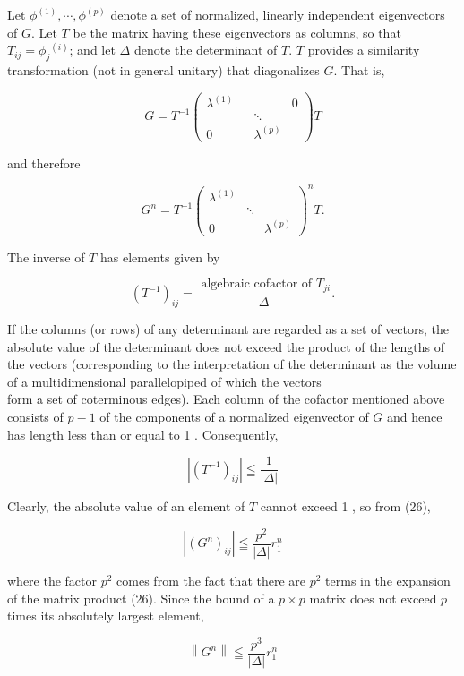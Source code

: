 \documentclass[10pt]{article}
\begin{document}
Let \(\phi^{(1)}, \cdots, \phi^{(p)}\) denote a set of normalized, linearly independent eigenvectors of \(G\). Let \(T\) be the matrix having these eigenvectors as columns, so that \(T_{i j}=\phi_{j}{ }^{(i)}\); and let \(\Delta\) denote the determinant of \(T\). \(T\) provides a similarity transformation (not in general unitary) that diagonalizes \(G\). That is,

\[
G=T^{-1}\left(\begin{array}{llll}
\lambda^{(1)} & & & 0 \\
& & \ddots & \\
0 & & \lambda^{(p)}
\end{array}\right) T
\]

and therefore

\[
G^{n}=T^{-1}\left(\begin{array}{lll}
\lambda^{(1)} & & \\
& \ddots & \\
0 & & \lambda^{(p)}
\end{array}\right)^{n} T .
\]

The inverse of \(T\) has elements given by

\[
\left(T^{-1}\right)_{i j}=\frac{\text { algebraic cofactor of } T_{j i}}{\Delta} .
\]

If the columns (or rows) of any determinant are regarded as a set of vectors, the absolute value of the determinant does not exceed the product of the lengths of the vectors (corresponding to the interpretation of the determinant as the volume of a multidimensional parallelopiped of which the vectors\\
form a set of coterminous edges). Each column of the cofactor mentioned above consists of \(p-1\) of the components of a normalized eigenvector of \(G\) and hence has length less than or equal to 1 . Consequently,

\[
\left|\left(T^{-1}\right)_{i j}\right| \leqq \frac{1}{|\Delta|}
\]

Clearly, the absolute value of an element of \(T\) cannot exceed 1 , so from (26),

\[
\left|\left(G^{n}\right)_{i j}\right| \leqq \frac{p^{2}}{|\Delta|} r_{1}^{n}
\]

where the factor \(p^{2}\) comes from the fact that there are \(p^{2}\) terms in the expansion of the matrix product (26). Since the bound of a \(p \times p\) matrix does not exceed \(p\) times its absolutely largest element,

\[
\left\|G^{n}\right\| \leqq \frac{p^{3}}{|\Delta|} r_{1}^{n}
\]
\end{document}
